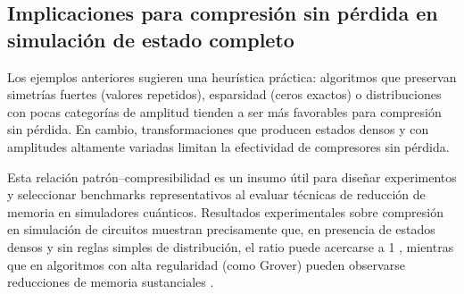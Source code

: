 \subsection{Implicaciones para compresión sin pérdida en simulación de estado completo}
\label{subsec:patrones_implicaciones}

Los ejemplos anteriores sugieren una heurística práctica: algoritmos que preservan simetrías fuertes (valores repetidos), esparsidad (ceros exactos) o distribuciones con pocas categorías de amplitud tienden a ser más favorables para compresión sin pérdida. En cambio, transformaciones que producen estados densos y con amplitudes altamente variadas limitan la efectividad de compresores sin pérdida.

Esta relación patrón--compresibilidad es un insumo útil para diseñar experimentos y seleccionar benchmarks representativos al evaluar técnicas de reducción de memoria en simuladores cuánticos. Resultados experimentales sobre compresión en simulación de circuitos muestran precisamente que, en presencia de estados densos y sin reglas simples de distribución, el ratio puede acercarse a 1 \cite{wu2018_sc18_aalc}, mientras que en algoritmos con alta regularidad (como Grover) pueden observarse reducciones de memoria sustanciales \cite{wu2019_fullstate}.
